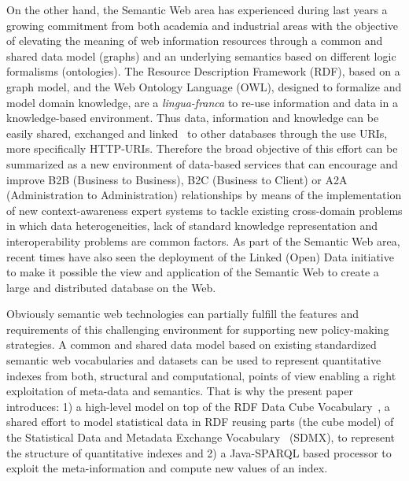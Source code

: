 On the other hand, the Semantic Web area has experienced during last years a growing commitment from both academia and industrial areas 
with the objective of elevating the meaning of web information resources through a common and shared data model (graphs) and 
an underlying semantics based on different logic formalisms (ontologies). The Resource Description Framework (RDF), based on a graph model, 
and the Web Ontology Language (OWL), designed to formalize and model domain knowledge, are a \textit{lingua-franca} to re-use information 
and data in a knowledge-based environment. Thus data, information and knowledge can be easily shared, exchanged and linked~\cite{Maali_Cyganiak_2011} 
to other databases through the use URIs, more specifically HTTP-URIs. Therefore the broad objective of this effort can 
be summarized as a new environment of data-based services that can encourage and improve B2B (Business to Business), B2C (Business to Client) or 
A2A (Administration to Administration) relationships by means of the implementation of new context-awareness expert systems 
to tackle existing cross-domain problems in which data heterogeneities, lack of standard knowledge representation and 
interoperability problems are common factors. As part of the Semantic Web area, recent times have also seen the deployment of 
the Linked (Open) Data initiative  to make it possible the view and application of the Semantic Web to create a large 
and distributed database on the Web. 

Obviously semantic web technologies can partially fulfill the features and requirements of this challenging environment for supporting 
new policy-making strategies. A common and shared data model based on existing standardized semantic web vocabularies and datasets can be used to 
represent quantitative indexes from both, structural and computational, points of view enabling a right exploitation of meta-data and semantics. 
That is why the present paper introduces: 1) a high-level model on top of the RDF Data Cube Vocabulary~\cite{rdf-data-cube}, a shared effort to model statistical data in RDF reusing parts 
(the cube model) of the Statistical Data and Metadata Exchange Vocabulary~\cite{sdmx} (SDMX), to represent the structure of quantitative indexes and 
2) a Java-SPARQL based processor to exploit the meta-information and compute new values of an index.

